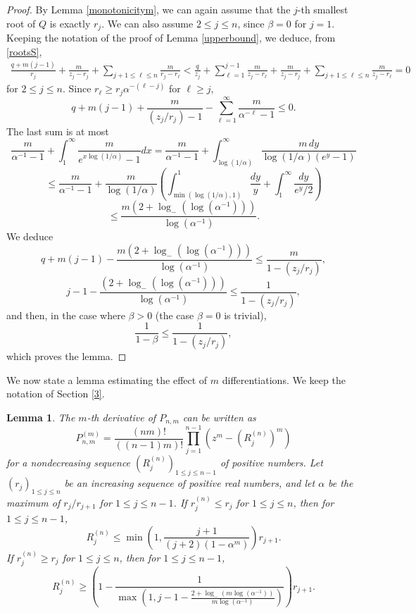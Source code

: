\documentclass[11pt]{amsart}
\newtheorem{lemma}[theorem]{Lemma}
\begin{document}
\begin{proof}
By Lemma \ref{monotonicitym}, we can again assume that the $j$-th smallest root of $Q$ is exactly $r_j$.
We can also assume $2 \leq j \leq n$, since $\beta = 0$ for $j = 1$. 
Keeping the notation of the proof of Lemma \ref{upperbound}, we deduce, from \eqref{rootsS},
\begin{align} 
\frac{q + m (j-1)}{ r_{j}} +
\frac{m}{z_j - r_j} + \sum_{j +1 \leq \ell \leq n}
\frac{m}{r_j - r_\ell}< \frac{q}{z_j}+ \sum_{\ell=1}^{j-1}\frac{m}{z_j-r_{\ell}}+\frac{m}{z_j-r_j}+ \sum_{j +1 \leq \ell \leq n}
\frac{m}{z_j - r_\ell} = 0
\end{align}
for $2 \leq j \leq n$. 
 Since $r_\ell \geq r_j \alpha^{- (\ell-j)} $
 for $\ell \geq j$,
$$ q + m (j-1)  +
\frac{m}{(z_j/r_j) -1} - \sum_{\ell = 1}^{\infty}
\frac{m}{ \alpha^{- \ell}- 1} \leq 0.$$
The last sum is at most 
$$\frac{m}{\alpha^{-1} - 1}
+ \int_{1}^{\infty} \frac{m}{ e^{ x \log (1/\alpha)} - 1} dx
= \frac{m}{\alpha^{-1} - 1}
+ \int_{ \log (1/\alpha)}^{\infty} \frac{m \, dy}{\log (1/\alpha) (e^{y} - 1)} 
$$ $$\leq \frac{m}{\alpha^{-1} - 1} 
+ \frac{m} {\log (1/\alpha)} \left(\int_{\min(\log (1/\alpha), 1)}^1 \frac{dy}{y} + \int_1^{\infty} \frac{dy}{e^y/2} \right) 
$$ $$ \leq \frac{ m \left(2 + 
\log_- ( \log (\alpha^{-1})) \right)}{\log (\alpha^{-1})}.$$
We deduce 
$$ q + m (j-1) -\frac{ m \left(2 + 
\log_- (  \log (\alpha^{-1})) \right)}{\log (\alpha^{-1})} \leq \frac{m}{1 - (z_j/r_j)},  $$
$$j-1 - \frac{  \left(2 + 
\log_- (  \log (\alpha^{-1})) \right)}{\log (\alpha^{-1})} \leq \frac{1}{1 - (z_j/r_j)},
$$
and then, in the case where $\beta > 0$
(the case $\beta = 0$ is trivial), 
$$\frac{1}{1-\beta} \leq \frac{1}{1 - (z_j/r_j)},$$
which proves the lemma. 
\end{proof}
We now state a lemma estimating the effect of $m$ differentiations. We keep the notation of Section \ref{3}. 
\begin{lemma} \label{boundsmderivations}
 The $m$-th derivative of $P_{n,m}$
can be written as 
$$P_{n,m}^{(m)} 
= \frac{(nm)!}{((n-1)m)!} 
\prod_{j=1}^{n-1} (z^m - (R_j^{(n)})^m)$$
for a nondecreasing sequence 
$(R_j^{(n)})_{1 \leq j \leq n-1}$ of positive numbers. Let $(r_j)_{1 \leq j \leq n}$ be an increasing sequence of positive real numbers, and 
let $\alpha$ be the maximum of $r_j/r_{j+1}$ for 
$1 \leq j \leq n-1$. 
If $r_j^{(n)} \leq r_j$ for $1 \leq j \leq n$,
then 
for $1 \leq j \leq n-1$, 
$$R_j^{(n)} \leq \min \left(1, \frac{j+1}{(j+2)(1- \alpha^m)} \right) r_{j+1}.$$
If $r_j^{(n)} \geq r_j$ for $1 \leq j \leq n$, 
then 
for $1 \leq j \leq n-1$, 
$$ R_j^{(n)} \geq \left( 1 - \frac{1}{ \max \left(1,  j - 1 - \frac{2 + \log_- (m \log (\alpha^{-1}) )}{m \log (\alpha^{-1})}   \right)} \right) r_{j+1}.$$
\end{lemma}
\end{document}
